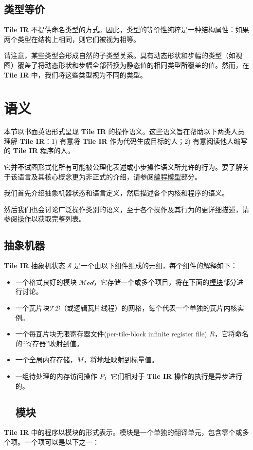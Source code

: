 \documentclass{article}
\begin{document}
\subsection{类型等价}

\textbf{Tile IR} 不提供命名类型的方式。因此，类型的等价性纯粹是一种结构属性：如果两个类型在结构上相同，则它们被视为相等。


请注意，某些类型会形成自然的子类型关系。具有动态形状和步幅的类型（如视图）覆盖了将动态形状和步幅全部替换为静态值的相同类型所覆盖的值。然而，在 \textbf{Tile IR} 中，我们将这些类型视为不同的类型。


\newpage
\section{语义}

本节以书面英语形式呈现 \textbf{Tile IR} 的操作语义。这些语义旨在帮助以下两类人员理解 \textbf{Tile IR}：1) 有意将 \textbf{Tile IR} 作为代码生成目标的人；2) 有意阅读他人编写的 \textbf{Tile IR} 程序的人。


它\textbf{并不}试图形式化所有可能被公理化表述或小步操作语义所允许的行为。要了解关于该语言及其核心概念更为非正式的介绍，请参阅\href{https://docs.nvidia.com/cuda/tile-ir/latest/sections/prog_model.html#section-prog-model}{编程模型}部分。


我们首先介绍抽象机器状态和语言定义，然后描述各个内核和程序的语义。


然后我们也会讨论广泛操作类别的语义，至于各个操作及其行为的更详细描述，请参阅\href{https://docs.nvidia.com/cuda/tile-ir/latest/sections/operations.html#section-operations}{操作}以获取完整列表。


\subsection{抽象机器}

\textbf{Tile IR} 抽象机状态 $\mathcal{S}$ 是一个由以下组件组成的元组，每个组件的解释如下：


\begin{itemize}
\item 一个格式良好的模块 $\mathcal{Mod}$，它存储一个或多个项目，将在下面的\href{https://docs.nvidia.com/cuda/tile-ir/latest/sections/semantics.html#sub-sec-modules}{模块}部分进行讨论。
\item 一个瓦片块${\mathcal{TB}}$（或逻辑瓦片线程）的网格，每个代表一个单独的瓦片内核实例。
\item 一个每瓦片块无限寄存器文件(per-tile-block infinite register file) $R$，它将命名的``寄存器''映射到值。
\item 一个全局内存存储，$M$，将地址映射到标量值。
\item 一组待处理的内存访问操作 $P$，它们相对于 \textbf{Tile IR} 操作的执行是异步进行的。


\subsection{模块}

\end{itemize}
\textbf{Tile IR} 中的程序以模块的形式表示。模块是一个单独的翻译单元，包含零个或多个项。一个项可以是以下之一：
\end{document}
